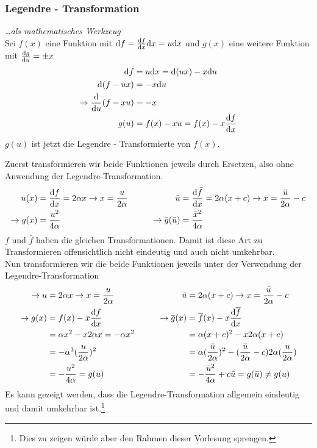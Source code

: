 \subsubsection{Legendre - Transformation} \textit{\dots als mathematisches Werkzeug}\\
Sei $f(x)$ eine Funktion mit $\mathrm d f = \frac{\mathrm d f}{\mathrm d x} \mathrm d x = u \mathrm d x$ und $g(x)$ eine weitere Funktion mit $\frac{\mathrm d g}{\mathrm d u} = \pm x$
\begin{align*}
\mathrm d f &= u\mathrm d x = \mathrm d (ux) - x\mathrm d u\\
\mathrm d (f-ux) &= - x \mathrm d u\\
\Rightarrow \frac{\mathrm d}{\mathrm d u}(f-xu) &= -x\\
g(u) &= f(x) - xu = f(x) - x\frac{\mathrm d f}{\mathrm d x}
\end{align*}
$g(u)$ ist jetzt die Legendre - Transformierte von $f(x)$.
	
	
	
\begin{beispiel*}[Transformieren von $f(x) = \alpha x^2$ und $\bar{f}(x) = \alpha(x+c)^2$]
	Zuerst transformieren wir beide Funktionen jeweils durch Ersetzen, also ohne Anwendung der Legendre-Transformation.
\begin{align*}
u(x) &= \frac{\mathrm d f}{\mathrm d x} = 2 \alpha x \rightarrow x= \frac{u}{2\alpha} & \qquad   \bar u &= \frac{\mathrm d \bar f}{\mathrm d x} = 2\alpha(x+c) \rightarrow x=\frac{\bar u}{2\alpha} - c\\
\rightarrow g(x) &= \frac{u^2}{4\alpha} & \qquad  \rightarrow \bar g(\bar u) &= \frac{\bar x^2}{4\alpha}
\end{align*}
$f$ und $\bar f$ haben die gleichen Transformationen. Damit ist diese Art zu Transformieren offensichtlich nicht eindeutig und auch nicht umkehrbar.\\
Nun transformieren wir die beide Funktionen jeweils unter der Verwendung der Legendre-Transformation
\begin{align*}
\rightarrow u &= 2\alpha x \rightarrow x= \frac {u}{2\alpha}      &  \qquad \bar{u} &= 2\alpha (x+c) \rightarrow x= \frac {\bar{u}}{2\alpha} -c\\
\rightarrow g(x) &= f(x) - x\frac{\mathrm d f}{\mathrm d x}  &  \qquad   \rightarrow \overline g(x) &= \overline f(x) - x\frac{\mathrm d \overline f}{\mathrm d x}\\
&= \alpha x^2 - x2\alpha x = -\alpha x^2         &    \qquad    &= \alpha (x+c)^2 - x 2\alpha( x+c)\\
&=-\alpha^3(\frac{u}{2\alpha})^2      &  \qquad    &= \alpha (\frac {\bar{u}}{2\alpha})^2 - (\frac {\bar u}{2\alpha} -c) 2\alpha( \frac {u}{2\alpha} )\\
&= -\frac{u^2}{4\alpha} = g(u)   &  \qquad    &= -\frac {\bar{u}^2}{4\alpha} +c\bar{u} = g(\bar{u}) \neq g(u)
\end{align*}
Es kann gezeigt werden, dass die Legendre-Transformation allgemein eindeutig und damit umkehrbar ist.\footnote{Dies zu zeigen würde aber den Rahmen dieser Vorlesung sprengen.}
\end{beispiel*}
